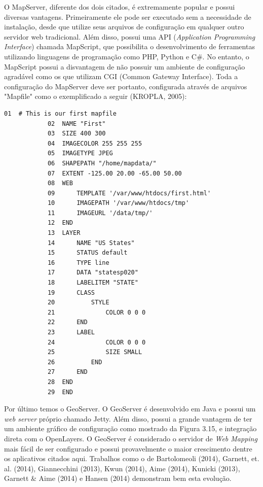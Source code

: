 		O MapServer, diferente dos dois citados, é extremamente popular e possui diversas vantagens. Primeiramente ele pode ser executado sem a necessidade de instalação, desde que utilize seus arquivos de configuração em qualquer outro servidor web tradicional. Além disso, possui uma API (\textit{Application Programming Interface}) chamada MapScript, que possibilita o desenvolvimento de ferramentas utilizando linguagens de programação como PHP, Python e C\#. No entanto, o MapScript possui a disvantagem de não possuir um ambiente de configuração agradável como os que utilizam CGI (Common Gateway Interface). Toda a configuração do MapServer deve ser portanto, configurada através de arquivos "Mapfile" como o exemplificado a seguir (KROPLA, 2005): 
		
		\begin{lstlisting}[float,floatplacement=H]
			01  # This is our first mapfile
			02  NAME "First"
			03  SIZE 400 300
			04  IMAGECOLOR 255 255 255
			05  IMAGETYPE JPEG
			06  SHAPEPATH "/home/mapdata/"
			07  EXTENT -125.00 20.00 -65.00 50.00
			08  WEB
			09      TEMPLATE '/var/www/htdocs/first.html'
			10      IMAGEPATH '/var/www/htdocs/tmp'
			11      IMAGEURL '/data/tmp/'
			12  END
			13  LAYER
			14      NAME "US States"
			15      STATUS default
			16      TYPE line
			17      DATA "statesp020"
			18      LABELITEM "STATE"
			19      CLASS
			20          STYLE
			21              COLOR 0 0 0
			22      END
			23      LABEL
			24              COLOR 0 0 0
			25              SIZE SMALL
			26          END
			27      END
			28  END
			29  END
		\end{lstlisting}
		
		Por último temos o GeoServer. O GeoServer é desenvolvido em Java e possui um \textit{web server} próprio chamado Jetty. Além disso, possui a grande vantagem de ter um ambiente gráfico de configuração como mostrado da Figura 3.15, e integração direta com o OpenLayers. O GeoServer é considerado o servidor de \textit{Web Mapping} mais fácil de ser configurado e possui provavelmente o maior crescimento dentre os aplicativos citados aqui. Trabalhos como o de Bartolomeoli (2014), Garnett, et. al. (2014), Giannecchini (2013), Kwun (2014), Aime (2014), Kunicki (2013), Garnett \& Aime (2014) e Hansen (2014) demonstram bem esta evolução.
		
